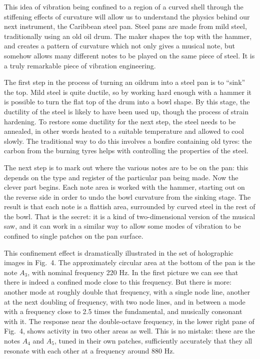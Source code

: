   This idea of vibration being confined to a region of a curved shell through 
  the stiffening effects of curvature will allow us to understand the physics 
  behind our next instrument, the Caribbean steel pan. Steel pans are made from 
  mild steel, traditionally using an old oil drum. The maker shapes the top 
  with the hammer, and creates a pattern of curvature which not only gives a 
  musical note, but somehow allows many different notes to be played on the 
  same piece of steel. It is a truly remarkable piece of vibration engineering. 

  The first step in the process of turning an oildrum into a steel pan is to 
  ``sink'' the top. Mild steel is quite ductile, so by working hard enough with 
  a hammer it is possible to turn the flat top of the drum into a bowl shape. 
  By this stage, the ductility of the steel is likely to have been used up, 
  though the process of strain hardening. To restore some ductility for the 
  next step, the steel needs to be annealed, in other words heated to a 
  suitable temperature and allowed to cool slowly. The traditional way to do 
  this involves a bonfire containing old tyres: the carbon from the burning 
  tyres helps with controlling the properties of the steel. 


  The next step is to mark out where the various notes are to be on the pan: 
  this depends on the type and register of the particular pan being made. Now 
  the clever part begins. Each note area is worked with the hammer, starting 
  out on the reverse side in order to undo the bowl curvature from the sinking 
  stage. The result is that each note is a flattish area, surrounded by curved 
  steel in the rest of the bowl. That is the secret: it is a kind of 
  two-dimensional version of the musical saw, and it can work in a similar way 
  to allow some modes of vibration to be confined to single patches on the pan 
  surface. 

  This confinement effect is dramatically illustrated in the set of holographic 
  images in Fig.\ 4. The approximately circular area at the bottom of the pan 
  is the note $A_3$, with nominal frequency 220 Hz. In the first picture we can 
  see that there is indeed a confined mode close to this frequency. But there 
  is more: another mode at roughly double that frequency, with a single node 
  line, another at the next doubling of frequency, with two node lines, and in 
  between a mode with a frequency close to 2.5 times the fundamental, and 
  musically consonant with it. The response near the double-octave frequency, 
  in the lower right pane of Fig.\ 4, shows activity in two other areas as 
  well. This is no mistake: these are the notes $A_4$ and $A_5$, tuned in their 
  own patches, sufficiently accurately that they all resonate with each other 
  at a frequency around 880 Hz. 


